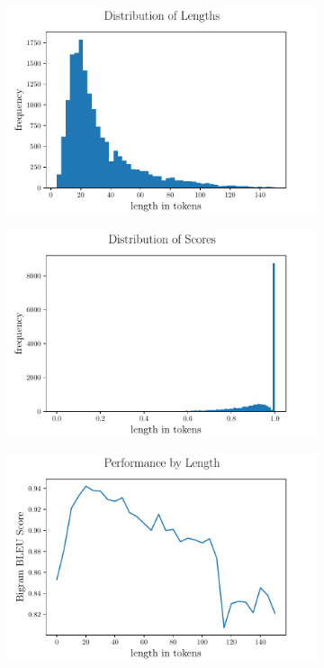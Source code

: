 \documentclass[12pt]{article}
\begin{document}
\begin{figure}[!h]
  \begin{subfigure}{0.5\textwidth}
		\includegraphics[scale=.425]{histogram.pdf}
		\centering
		\caption{}
	\end{subfigure}
	\begin{subfigure}{0.5\textwidth}
		\includegraphics[scale=.425]{scorehistogram.pdf}
		\centering
		\caption{}
	\end{subfigure}
  \begin{subfigure}{1.0\textwidth}
		\centering
		\includegraphics[scale=.425]{scorebylen.pdf}

\end{subfigure}
\end{figure}
\end{document}
